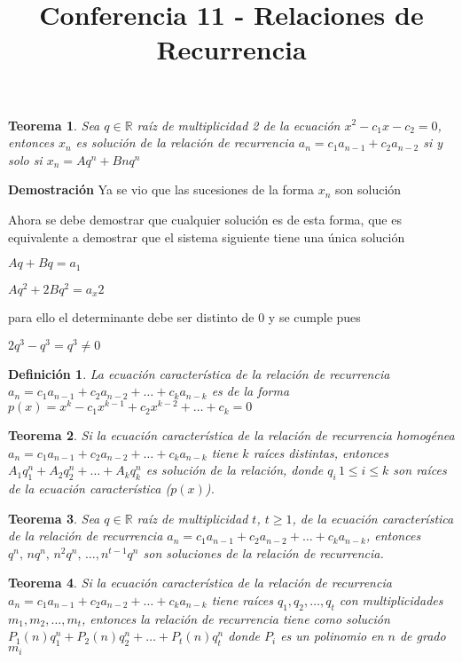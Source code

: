 \documentclass[a4paper,12pt]{report}
\title{Conferencia 11 - Relaciones de Recurrencia}
\author{}
\newtheorem*{teo}{Teorema}
\newtheorem*{dfn}{Definición}
\begin{document}
\maketitle





\begin{teo}
 Sea $q\in\mathbb{R}$ raíz de multiplicidad 2 de la ecuación $x^2-c_1x-c_2=0$, entonces $x_n$ es solución de la relación de recurrencia $a_n=c_1a_{n-1}+c_2a_{n-2}$ si y solo si $x_n=Aq^n + Bnq^n$ 
\end{teo}

\textbf{Demostración}
Ya se vio que las sucesiones de la forma $x_n$ son solución

Ahora se debe demostrar que cualquier solución es de esta forma, que es equivalente a demostrar que el sistema siguiente tiene una única solución

$Aq+Bq=a_1$

$Aq^2+2Bq^2=a_x2$

para ello el determinante debe ser distinto de 0 y se cumple pues

$2q^3-q^3=q^3\neq0$

\begin{dfn}
 La ecuación característica de la relación de recurrencia\\ 
 $a_n=c_1a_{n-1}+c_2a_{n-2}+\dots+c_ka_{n-k}$ es de la forma\\ 
 $p(x)=x^k-c_1x^{k-1}+c_2x^{k-2}+\dots+c_k=0$
\end{dfn}

\begin{teo}
 Si la ecuación característica de la relación de recurrencia homogénea $a_n=c_1a_{n-1}+c_2a_{n-2}+\dots+c_ka_{n-k}$ tiene $k$ raíces distintas, entonces 
 $A_1q^n_1+A_2q^n_2+\dots+A_kq^n_k$ es solución de la relación, donde $q_i\, 1\leq i\leq k$ son raíces de la ecuación característica ($p(x)$). 
\end{teo}

\begin{teo}
 Sea $q\in\mathbb{R}$ raíz de multiplicidad $t$, $t\geq1$, de la ecuación característica de la relación de recurrencia $a_n=c_1a_{n-1}+c_2a_{n-2}+\dots+c_ka_{n-k}$, entonces $q^n,\, nq^n,\, n^2q^n,\,\dots,n^{t-1}q^n $ son soluciones de la relación de recurrencia.
\end{teo}

\begin{teo}
 Si la ecuación característica de la relación de recurrencia\\ 
 $a_n=c_1a_{n-1}+c_2a_{n-2}+\dots+c_ka_{n-k}$ tiene raíces $q_1,q_2,\dots,q_t$ con multiplicidades $m_1, m_2,\dots, m_t$, entonces la relación de recurrencia tiene como solución
 $P_1(n)q^n_1+P_2(n)q^n_2+\dots+P_t(n)q^n_t$ donde $P_i$ es un polinomio en $n$ de grado $m_i $
\end{teo}
\end{document}
